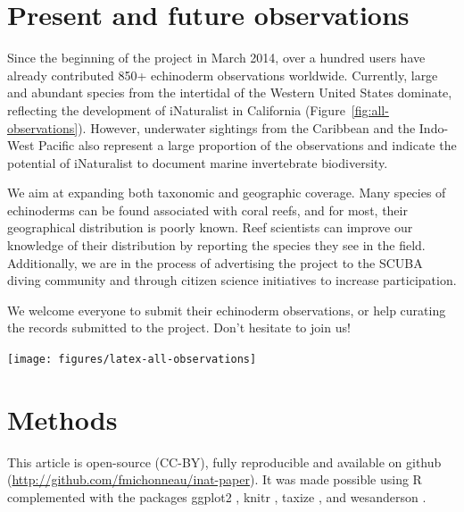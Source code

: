 \documentclass[11pt]{article}\usepackage[]{graphicx}\usepackage[]{color}
\newenvironment{knitrout}{}{} %
\begin{document}
\section*{Present and future observations}

Since the beginning of the project in March 2014, over a hundred users have
already contributed 850+ echinoderm observations worldwide. Currently, large and
abundant species from the intertidal of the Western United States dominate,
reflecting the development of iNaturalist in California
(Figure~\ref{fig:all-observations}). However, underwater sightings from the
Caribbean and the Indo-West Pacific also represent a large proportion of the
observations and indicate the potential of iNaturalist to document marine
invertebrate biodiversity.

We aim at expanding both taxonomic and geographic coverage. Many species of
echinoderms can be found associated with coral reefs, and for most, their
geographical distribution is poorly known. Reef scientists can improve our
knowledge of their distribution by reporting the species they see in the
field. Additionally, we are in the process of advertising the project to the
SCUBA diving community and through citizen science initiatives to increase
participation.

We welcome everyone to submit their echinoderm observations, or help curating
the records submitted to the project. Don't hesitate to join us!

\begin{center}
\begin{knitrout}
\color{fgcolor}
\texttt{[image: figures/latex-all-observations]} 

\end{knitrout}
\label{fig:all-observations}
\end{center}

\section*{Methods}

{\small This article is open-source (CC-BY), fully reproducible and available on
  github
  (\href{https://github.com/fmichonneau/inat-paper/}{http://github.com/fmichonneau/inat-paper}). It
  was made possible using R \citep{Rproject} complemented with the packages
  ggplot2 \citep{Wickham2009}, knitr \citep{Xie2014}, taxize
  \citep{Chamberlain2013,Chamberlain2014}, and wesanderson \citep{Ram2014}.  }




\end{document}
